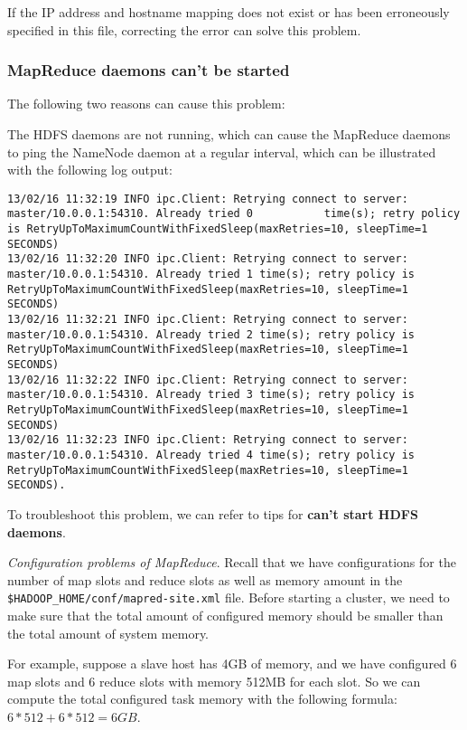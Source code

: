 If the IP address and hostname mapping does not exist or has been erroneously specified in this file, correcting the error can solve this problem.
\subsubsection*{MapReduce daemons can't be started}
The following two reasons can cause this problem:

The HDFS daemons are not running, which can cause the MapReduce daemons to ping the NameNode daemon at a regular interval, which can be illustrated with the following log output:
\begin{verbatim}
13/02/16 11:32:19 INFO ipc.Client: Retrying connect to server: master/10.0.0.1:54310. Already tried 0           time(s); retry policy is RetryUpToMaximumCountWithFixedSleep(maxRetries=10, sleepTime=1 SECONDS)
13/02/16 11:32:20 INFO ipc.Client: Retrying connect to server: master/10.0.0.1:54310. Already tried 1 time(s); retry policy is RetryUpToMaximumCountWithFixedSleep(maxRetries=10, sleepTime=1 SECONDS)
13/02/16 11:32:21 INFO ipc.Client: Retrying connect to server: master/10.0.0.1:54310. Already tried 2 time(s); retry policy is RetryUpToMaximumCountWithFixedSleep(maxRetries=10, sleepTime=1 SECONDS)
13/02/16 11:32:22 INFO ipc.Client: Retrying connect to server: master/10.0.0.1:54310. Already tried 3 time(s); retry policy is RetryUpToMaximumCountWithFixedSleep(maxRetries=10, sleepTime=1 SECONDS)
13/02/16 11:32:23 INFO ipc.Client: Retrying connect to server: master/10.0.0.1:54310. Already tried 4 time(s); retry policy is RetryUpToMaximumCountWithFixedSleep(maxRetries=10, sleepTime=1 SECONDS).
\end{verbatim}

To troubleshoot this problem, we can refer to tips for \textbf{can't start HDFS daemons}.

\emph{Configuration problems of MapReduce}. Recall that we have configurations for the number of map slots and reduce slots as well as memory amount in the \verb|$HADOOP_HOME/conf/mapred-site.xml| file. Before starting a cluster, we need to make sure that the total amount of configured memory should be smaller than the total amount of system memory.

For example, suppose a slave host has 4GB of memory, and we have configured 6 map slots and 6 reduce slots with memory 512MB for each slot. So we can compute the total configured task memory with the following formula:  $6 * 512  + 6 * 512 = 6GB$.

